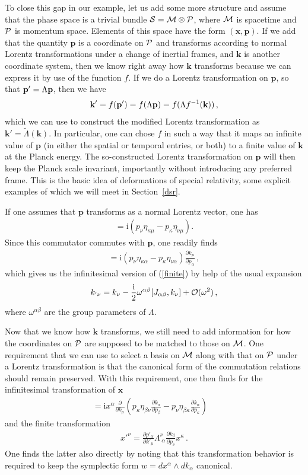 \documentclass{article}
\def\beqn{\begin{eqnarray}}
\def\eeqn{\end{eqnarray}}
\begin{document}
To close this gap in our example, let us add some more structure and assume that the phase space is a 
trivial bundle ${\cal S} = {\cal M} \otimes {\cal P}$, where ${\cal M}$ is spacetime and ${\cal P}$ is momentum space.
Elements of this space have the form $(\mathbf{x},\mathbf{p})$. If we add that the quantity $\mathbf{p}$ is a coordinate on ${\cal P}$
and transforms according to normal 
Lorentz transformations under a change of inertial frames, and $\mathbf{k}$ is another coordinate system, then we know right away how $\mathbf{k}$ transforms because
 we can express it 
by use of the function $f$. If we do a Lorentz transformation
on $\mathbf{p}$, so that ${\bf p'} = \Lambda \mathbf{p}$, then we have
\beqn
\mathbf{k}' = f({\bf p'}) = f(\Lambda \mathbf{p}) = f(\Lambda f^{-1}(\mathbf{k})) \,,  \label{finite}
\eeqn
which we can use to construct the modified Lorentz transformation as $\mathbf{k}' = \widetilde{\Lambda}(\mathbf{k})$.
In particular, one can chose $f$ in such a way that it maps an infinite value of $\mathbf{p}$ (in either the spatial or temporal
entries, or both) to a finite value of $\mathbf{k}$ at the Planck energy. The so-constructed Lorentz transformation
on $\mathbf{p}$ will then keep the Planck scale invariant, importantly without introducing any preferred frame. This
is the basic idea of deformations of special relativity, some explicit examples of which we will meet in
Section~\ref{dsr}. 

If one assumes that $\mathbf{p}$ transforms as a normal Lorentz vector, one has
\beqn
[J_{\kappa\nu},p_\mu] = \mathrm{i}\left( p_\nu \eta_{\kappa \mu}  - p_\kappa \eta_{\nu\mu} \right ) .
\eeqn
Since this commutator commutes with $\mathbf{p}$, one readily finds
\beqn
[J_{\kappa\nu},k_\mu] = \mathrm{i}\left( p_\nu \eta_{\kappa \alpha}  - p_\kappa \eta_{\nu \alpha} \right) \frac{\partial k_\mu}{\partial p_\alpha}  \,,
\label{Jk}
\eeqn
which gives us the infinitesimal version of (\ref{finite}) by help of the usual expansion
\beqn
k_{'\nu} = k_\nu - \frac{\mathrm{i}}{2} \omega^{\alpha \beta} [ J_{\alpha \beta}, k_\nu ] + {\cal O}(\omega^2) \,,
\eeqn
where $\omega^{\alpha \beta}$ are the group parameters of $\Lambda$.  

Now that we know how $\mathbf{k}$ transforms, we still need to add information for how the coordinates on ${\cal P}$ are
supposed to be matched to those on ${\cal M}$. One requirement that we
can use to select a basis on ${\cal M}$ along with that on ${\cal P}$ under a Lorentz transformation is
that the canonical form of the commutation relations should remain preserved. 
With this requirement, one then finds for the infinitesimal transformation of $\mathbf{x}$~\cite{Panes:2011cd}
\beqn
[J_{\kappa\nu}, x^\mu] = \mathrm{i} x^\alpha \frac{\partial}{\partial k_\mu} \left(p_\kappa \eta_{\beta \nu}\frac{\partial k_\alpha}{\partial p_\beta} 
- p_\nu \eta_{\beta \kappa}\frac{\partial k_\alpha}{\partial p_\kappa}\right)  \label{Jx} \quad
\eeqn
and the finite transformation
\beqn
{x'}^\nu = \frac{\partial p'_\alpha}{\partial k'_\mu} \Lambda^\nu_{\; \alpha} \frac{\partial k_\beta}{\partial p_\nu} x^\kappa  \,.
\eeqn 
One finds the latter also directly by noting that this transformation behavior is required to keep the symplectic
form $w = dx^\alpha \wedge d k_\alpha$ canonical.
\end{document}

